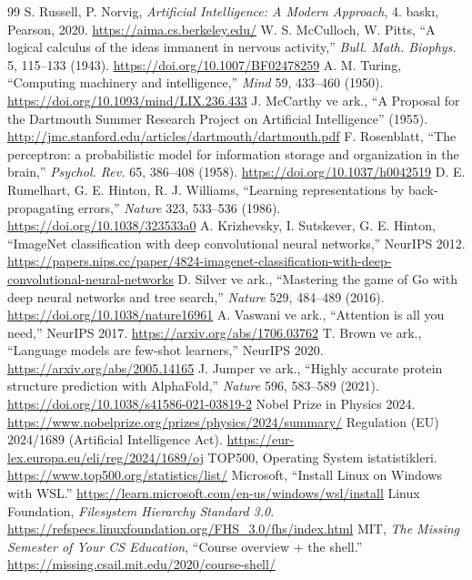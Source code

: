 \documentclass[11pt,a4paper]{article}
\begin{document}
\begin{thebibliography}{99}\small
{} S. Russell, P. Norvig, \emph{Artificial Intelligence: A Modern Approach}, 4. baskı, Pearson, 2020. \url{https://aima.cs.berkeley.edu/}
 W. S. McCulloch, W. Pitts, ``A logical calculus of the ideas immanent in nervous activity,'' \emph{Bull. Math. Biophys.} 5, 115–133 (1943). \url{https://doi.org/10.1007/BF02478259}
 A. M. Turing, ``Computing machinery and intelligence,'' \emph{Mind} 59, 433–460 (1950). \url{https://doi.org/10.1093/mind/LIX.236.433}
 J. McCarthy ve ark., ``A Proposal for the Dartmouth Summer Research Project on Artificial Intelligence'' (1955). \url{http://jmc.stanford.edu/articles/dartmouth/dartmouth.pdf}
 F. Rosenblatt, ``The perceptron: a probabilistic model for information storage and organization in the brain,'' \emph{Psychol. Rev.} 65, 386–408 (1958). \url{https://doi.org/10.1037/h0042519}
 D. E. Rumelhart, G. E. Hinton, R. J. Williams, ``Learning representations by back-propagating errors,'' \emph{Nature} 323, 533–536 (1986). \url{https://doi.org/10.1038/323533a0}
 A. Krizhevsky, I. Sutskever, G. E. Hinton, ``ImageNet classification with deep convolutional neural networks,'' NeurIPS 2012. \url{https://papers.nips.cc/paper/4824-imagenet-classification-with-deep-convolutional-neural-networks}
 D. Silver ve ark., ``Mastering the game of Go with deep neural networks and tree search,'' \emph{Nature} 529, 484–489 (2016). \url{https://doi.org/10.1038/nature16961}
 A. Vaswani ve ark., ``Attention is all you need,'' NeurIPS 2017. \url{https://arxiv.org/abs/1706.03762}
 T. Brown ve ark., ``Language models are few-shot learners,'' NeurIPS 2020. \url{https://arxiv.org/abs/2005.14165}
 J. Jumper ve ark., ``Highly accurate protein structure prediction with AlphaFold,'' \emph{Nature} 596, 583–589 (2021). \url{https://doi.org/10.1038/s41586-021-03819-2}
 Nobel Prize in Physics 2024. \url{https://www.nobelprize.org/prizes/physics/2024/summary/}
 Regulation (EU) 2024/1689 (Artificial Intelligence Act). \url{https://eur-lex.europa.eu/eli/reg/2024/1689/oj}
 TOP500, Operating System istatistikleri. \url{https://www.top500.org/statistics/list/}
 Microsoft, ``Install Linux on Windows with WSL.'' \url{https://learn.microsoft.com/en-us/windows/wsl/install}
 Linux Foundation, \emph{Filesystem Hierarchy Standard 3.0}. \url{https://refspecs.linuxfoundation.org/FHS_3.0/fhs/index.html}
 MIT, \emph{The Missing Semester of Your CS Education}, ``Course overview + the shell.'' \url{https://missing.csail.mit.edu/2020/course-shell/}
\end{thebibliography}
\end{document}
